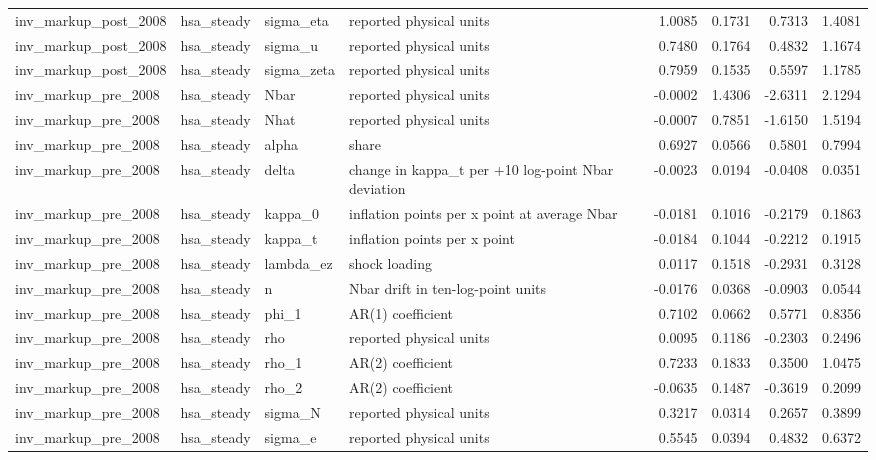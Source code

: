 \begin{tabular}{llllrrrr}
inv\_markup\_post\_2008 & hsa\_steady & sigma\_eta & reported physical units & 1.0085 & 0.1731 & 0.7313 & 1.4081 \\
inv\_markup\_post\_2008 & hsa\_steady & sigma\_u & reported physical units & 0.7480 & 0.1764 & 0.4832 & 1.1674 \\
inv\_markup\_post\_2008 & hsa\_steady & sigma\_zeta & reported physical units & 0.7959 & 0.1535 & 0.5597 & 1.1785 \\
inv\_markup\_pre\_2008 & hsa\_steady & Nbar & reported physical units & -0.0002 & 1.4306 & -2.6311 & 2.1294 \\
inv\_markup\_pre\_2008 & hsa\_steady & Nhat & reported physical units & -0.0007 & 0.7851 & -1.6150 & 1.5194 \\
inv\_markup\_pre\_2008 & hsa\_steady & alpha & share & 0.6927 & 0.0566 & 0.5801 & 0.7994 \\
inv\_markup\_pre\_2008 & hsa\_steady & delta & change in kappa\_t per +10 log-point Nbar deviation & -0.0023 & 0.0194 & -0.0408 & 0.0351 \\
inv\_markup\_pre\_2008 & hsa\_steady & kappa\_0 & inflation points per x point at average Nbar & -0.0181 & 0.1016 & -0.2179 & 0.1863 \\
inv\_markup\_pre\_2008 & hsa\_steady & kappa\_t & inflation points per x point & -0.0184 & 0.1044 & -0.2212 & 0.1915 \\
inv\_markup\_pre\_2008 & hsa\_steady & lambda\_ez & shock loading & 0.0117 & 0.1518 & -0.2931 & 0.3128 \\
inv\_markup\_pre\_2008 & hsa\_steady & n & Nbar drift in ten-log-point units & -0.0176 & 0.0368 & -0.0903 & 0.0544 \\
inv\_markup\_pre\_2008 & hsa\_steady & phi\_1 & AR(1) coefficient & 0.7102 & 0.0662 & 0.5771 & 0.8356 \\
inv\_markup\_pre\_2008 & hsa\_steady & rho & reported physical units & 0.0095 & 0.1186 & -0.2303 & 0.2496 \\
inv\_markup\_pre\_2008 & hsa\_steady & rho\_1 & AR(2) coefficient & 0.7233 & 0.1833 & 0.3500 & 1.0475 \\
inv\_markup\_pre\_2008 & hsa\_steady & rho\_2 & AR(2) coefficient & -0.0635 & 0.1487 & -0.3619 & 0.2099 \\
inv\_markup\_pre\_2008 & hsa\_steady & sigma\_N & reported physical units & 0.3217 & 0.0314 & 0.2657 & 0.3899 \\
inv\_markup\_pre\_2008 & hsa\_steady & sigma\_e & reported physical units & 0.5545 & 0.0394 & 0.4832 & 0.6372 \\

\end{tabular}
